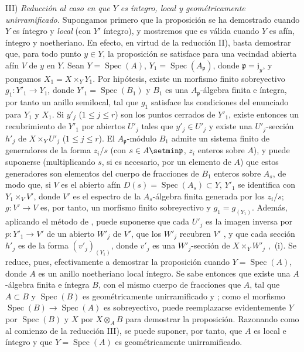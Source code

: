 III) \emph{Reducción al caso en que $Y$ es íntegro, local y geométricamente unirramificado.}
Supongamos primero que la proposición se ha demostrado cuando $Y$ es íntegro y \emph{local} (con $Y'$ íntegro), y mostremos que es válida cuando $Y$ es afín, íntegro y noetheriano.
En efecto, en virtud de la reducción II), basta demostrar que, para todo punto $y\in Y$, la proposición se satisface para una vecindad abierta afín $V$ de $y$ en $Y$.
Sean $Y=\operatorname{Spec}(A)$, $Y_1=\operatorname{Spec}(A_{\mathfrak p})$, donde $\mathfrak p=\mathfrak j_y$, y pongamos $X_1=X\times_Y Y_1$.
Por hipótesis, existe un morfismo finito sobreyectivo $g_1:Y'_1\to Y_1$, donde $Y'_1=\operatorname{Spec}(B_1)$ y $B_1$ es una $A_{\mathfrak p}$-álgebra finita e íntegra, por tanto un anillo semilocal, tal que $g_1$ satisface las condiciones del enunciado para $Y_1$ y $X_1$.
Si $y'_j$ ($1\leq j\leq r$) son los puntos cerrados de $Y'_1$, existe entonces un recubrimiento de $Y'_1$ por abiertos $U'_j$ tales que $y'_j\in U'_j$ y existe una $U'_j$-sección $h'_j$ de $X\times_Y U'_j$ ($1\leq j\leq r$).
El $A_{\mathfrak p}$-módulo $B_1$ admite un sistema finito de generadores de la forma $z_i/s$ (con $s\in A\setmin\mathfrak p$,
$z_i$ enteros sobre $A$), y puede suponerse (multiplicando $s$, si es necesario, por un elemento de $A$) que estos generadores son elementos del cuerpo de fracciones de $B_1$ enteros sobre $A_s$, de modo que, si $V$ es el abierto afín $D(s)=\operatorname{Spec}(A_s)\subset Y$, $Y'_1$ se identifica con $Y_1\times_V V'$, donde $V'$ es el espectro de la $A_s$-álgebra finita generada por los $z_i/s$; $g:V'\to V$ es, por tanto, un morfismo finito sobreyectivo y $g_1=g_{(Y_1)}$.
Además, aplicando el método de , puede suponerse que cada $U'_j$ es la imagen inversa por $p:Y'_1\to V'$ de un abierto $W'_j$ de $V'$, que los $W'_j$ recubren $V'$ , y que cada sección $h'_j$ es de la forma $(v'_j)_{(Y_1)}$, donde $v'_j$ es una $W'_j$-sección de $X\times_Y W'_j$ ,~(i).
Se reduce, pues, efectivamente a demostrar la proposición cuando $Y=\operatorname{Spec}(A)$, donde $A$ es un anillo noetheriano local íntegro.
Se sabe entonces que existe una $A$-álgebra finita e íntegra $B$, con el mismo cuerpo de fracciones que $A$, tal que $A\subset B$ y $\operatorname{Spec}(B)$ es geométricamente unirramificado  y ; como el morfismo $\operatorname{Spec}(B)\to\operatorname{Spec}(A)$ es sobreyectivo, puede reemplazarse evidentemente $Y$ por $\operatorname{Spec}(B)$ y $X$ por $X\otimes_A B$ para demostrar la proposición.
Razonando como al comienzo de la reducción III), se puede suponer, por tanto, que $A$ es local e íntegro y que $Y=\operatorname{Spec}(A)$ es geométricamente unirramificado.

